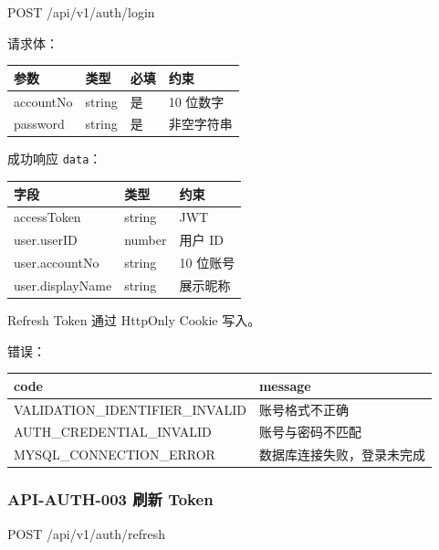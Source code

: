 \documentclass[
  a4paper,
  UTF8]{ctexart}
\newenvironment{Shaded}{}{}
\newcommand{\NormalTok}[1]{#1}
\begin{document}
\begin{Shaded}
\begin{Highlighting}[]
\NormalTok{POST /api/v1/auth/login}
\end{Highlighting}
\end{Shaded}

请求体：

\begin{longtable}[]{@{}llll@{}}
\toprule
参数 & 类型 & 必填 & 约束 \\
\midrule
\endhead
accountNo & string & 是 & 10 位数字 \\
password & string & 是 & 非空字符串 \\
\bottomrule
\end{longtable}

成功响应 \texttt{data}：

\begin{longtable}[]{@{}lll@{}}
\toprule
字段 & 类型 & 约束 \\
\midrule
\endhead
accessToken & string & JWT \\
user.userID & number & 用户 ID \\
user.accountNo & string & 10 位账号 \\
user.displayName & string & 展示昵称 \\
\bottomrule
\end{longtable}

Refresh Token 通过 HttpOnly Cookie 写入。

错误：

\begin{longtable}[]{@{}ll@{}}
\toprule
code & message \\
\midrule
\endhead
VALIDATION\_IDENTIFIER\_INVALID & 账号格式不正确 \\
AUTH\_CREDENTIAL\_INVALID & 账号与密码不匹配 \\
MYSQL\_CONNECTION\_ERROR & 数据库连接失败，登录未完成 \\
\bottomrule
\end{longtable}

\hypertarget{api-auth-003-ux5237ux65b0-token}{%
\subsubsection{API-AUTH-003 刷新
Token}\label{api-auth-003-ux5237ux65b0-token}}

\begin{Shaded}
\begin{Highlighting}[]
\NormalTok{POST /api/v1/auth/refresh}
\end{Highlighting}
\end{Shaded}
\end{document}
